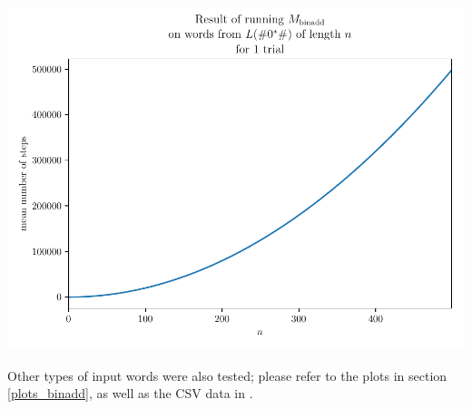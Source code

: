 \begin{center}
    \includegraphics[width=\textwidth]{images/plots/binadd-accepting_zeros.pdf}
\end{center}

Other types of input words were also tested; please refer to the plots in section \ref{plots_binadd}, as well as the CSV data in . 